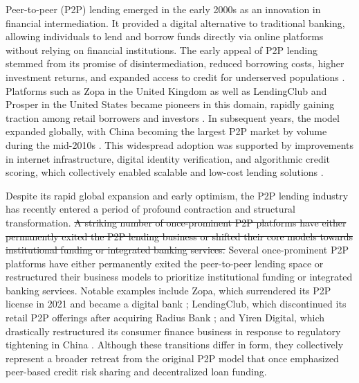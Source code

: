 \documentclass[pdflatex,sn-apa]{sn-jnl}%
\theoremstyle{thmstyleone}%
\theoremstyle{thmstyletwo}%
\theoremstyle{thmstylethree}%
\begin{document}
Peer-to-peer (P2P) lending emerged in the early 2000s as an innovation in financial intermediation. It provided a digital alternative to traditional banking, allowing individuals to lend and borrow funds directly via online platforms without relying on financial institutions. The early appeal of P2P lending stemmed from its promise of disintermediation, reduced borrowing costs, higher investment returns, and expanded access to credit for underserved populations \citep{klafft_peer_2008, freedman_information_2017}. Platforms such as Zopa in the United Kingdom as well as LendingClub and Prosper in the United States became pioneers in this domain, rapidly gaining traction among retail borrowers and investors \citep{Morse2015463}. In subsequent years, the model expanded globally, with China becoming the largest P2P market by volume during the mid-2010s \citep{huang_online_2018}. This widespread adoption was supported by improvements in internet infrastructure, digital identity verification, and algorithmic credit scoring, which collectively enabled scalable and low-cost lending solutions \citep{bone-winkel_improving_2024}.

Despite its rapid global expansion and early optimism, the P2P lending industry has recently entered a period of profound contraction and structural transformation. \sout{A striking number of once-prominent P2P platforms have either permanently exited the P2P lending business or shifted their core models towards institutional funding or integrated banking services.} \textcolor{NavyBlue}{Several once-prominent P2P platforms have either permanently exited the peer-to-peer lending space or restructured their business models to prioritize institutional funding or integrated banking services.} Notable examples include Zopa, which surrendered its P2P license in 2021 and became a digital bank \citep{zopa_bank_limited_zopa_2021,zopa_bank_limited_our_2023}; LendingClub, which discontinued its retail P2P offerings after acquiring Radius Bank \citep{frankel_lendingclub_2020}; and Yiren Digital, which drastically restructured its consumer finance business in response to regulatory tightening in China \citep{nemoto_optimal_2019}. Although these transitions differ in form, they collectively represent a broader retreat from the original P2P model that once emphasized peer-based credit risk sharing and decentralized loan funding.
\end{document}
